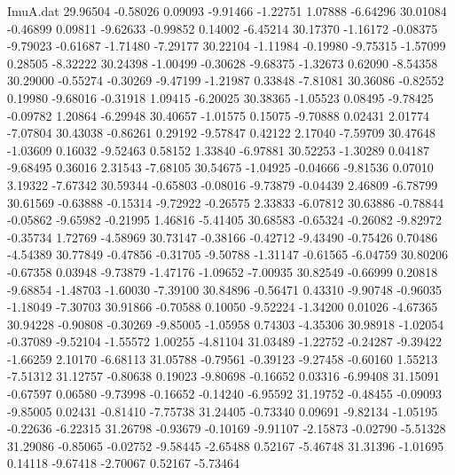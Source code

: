 \begin{filecontents}{ImuA.dat}
  29.96504   -0.58026    0.09093   -9.91466   -1.22751    1.07888   -6.64296
  30.01084   -0.46899    0.09811   -9.62633   -0.99852    0.14002   -6.45214
  30.17370   -1.16172   -0.08375   -9.79023   -0.61687   -1.71480   -7.29177
  30.22104   -1.11984   -0.19980   -9.75315   -1.57099    0.28505   -8.32222
  30.24398   -1.00499   -0.30628   -9.68375   -1.32673    0.62090   -8.54358
  30.29000   -0.55274   -0.30269   -9.47199   -1.21987    0.33848   -7.81081
  30.36086   -0.82552    0.19980   -9.68016   -0.31918    1.09415   -6.20025
  30.38365   -1.05523    0.08495   -9.78425   -0.09782    1.20864   -6.29948
  30.40657   -1.01575    0.15075   -9.70888    0.02431    2.01774   -7.07804
  30.43038   -0.86261    0.29192   -9.57847    0.42122    2.17040   -7.59709
  30.47648   -1.03609    0.16032   -9.52463    0.58152    1.33840   -6.97881
  30.52253   -1.30289    0.04187   -9.68495    0.36016    2.31543   -7.68105
  30.54675   -1.04925   -0.04666   -9.81536    0.07010    3.19322   -7.67342
  30.59344   -0.65803   -0.08016   -9.73879   -0.04439    2.46809   -6.78799
  30.61569   -0.63888   -0.15314   -9.72922   -0.26575    2.33833   -6.07812
  30.63886   -0.78844   -0.05862   -9.65982   -0.21995    1.46816   -5.41405
  30.68583   -0.65324   -0.26082   -9.82972   -0.35734    1.72769   -4.58969
  30.73147   -0.38166   -0.42712   -9.43490   -0.75426    0.70486   -4.54389
  30.77849   -0.47856   -0.31705   -9.50788   -1.31147   -0.61565   -6.04759
  30.80206   -0.67358    0.03948   -9.73879   -1.47176   -1.09652   -7.00935
  30.82549   -0.66999    0.20818   -9.68854   -1.48703   -1.60030   -7.39100
  30.84896   -0.56471    0.43310   -9.90748   -0.96035   -1.18049   -7.30703
  30.91866   -0.70588    0.10050   -9.52224   -1.34200    0.01026   -4.67365
  30.94228   -0.90808   -0.30269   -9.85005   -1.05958    0.74303   -4.35306
  30.98918   -1.02054   -0.37089   -9.52104   -1.55572    1.00255   -4.81104
  31.03489   -1.22752   -0.24287   -9.39422   -1.66259    2.10170   -6.68113
  31.05788   -0.79561   -0.39123   -9.27458   -0.60160    1.55213   -7.51312
  31.12757   -0.80638    0.19023   -9.80698   -0.16652    0.03316   -6.99408
  31.15091   -0.67597    0.06580   -9.73998   -0.16652   -0.14240   -6.95592
  31.19752   -0.48455   -0.09093   -9.85005    0.02431   -0.81410   -7.75738
  31.24405   -0.73340    0.09691   -9.82134   -1.05195   -0.22636   -6.22315
  31.26798   -0.93679   -0.10169   -9.91107   -2.15873   -0.02790   -5.51328
  31.29086   -0.85065   -0.02752   -9.58445   -2.65488    0.52167   -5.46748
  31.31396   -1.01695    0.14118   -9.67418   -2.70067    0.52167   -5.73464

\end{filecontents}
